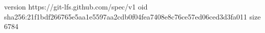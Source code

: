 version https://git-lfs.github.com/spec/v1
oid sha256:21f1bdf266765e5aa1e5597aa2cdb0f04fea7408e8c76ce57ed06ced3d3fa011
size 6784

